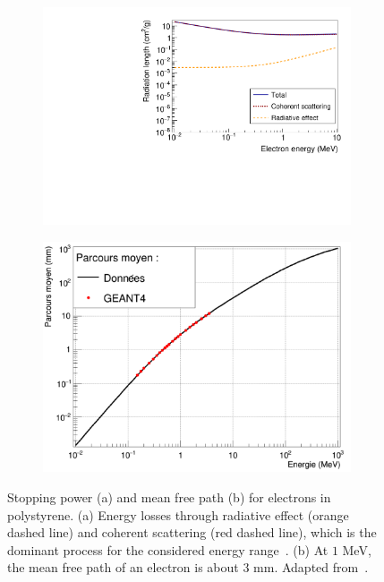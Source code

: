 \begin{figure}[h]
  \centering
  \begin{subfigure}[t]{0.48\textwidth}
    \centering
    \includegraphics[width=1\textwidth]{commissioning/fig_commissioning/electron_energy_loss.pdf}
    \captionsetup{justification=centering}
    \caption{
      \label{subfig:electron_attenuation}}
  \end{subfigure}
  \hfill
  \begin{subfigure}[t]{0.48\textwidth}
    \centering
    \includegraphics[width=1\textwidth]{commissioning/fig_commissioning/free_path_electrons.pdf}
    \captionsetup{justification=centering}
    \caption{\label{subfig:electron_free_path}}
  \end{subfigure}
  \caption{Stopping power (a) and mean free path (b) for electrons in polystyrene.
    (a) Energy losses through radiative effect (orange dashed line) and coherent scattering (red dashed line), which is the dominant process for the considered energy range~\cite{web:nist_estar}.
    (b) At $1$ MeV, the mean free path of an electron is about $3$ mm.
    Adapted from~\cite{HuberThesis}.
  }
\end{figure}
